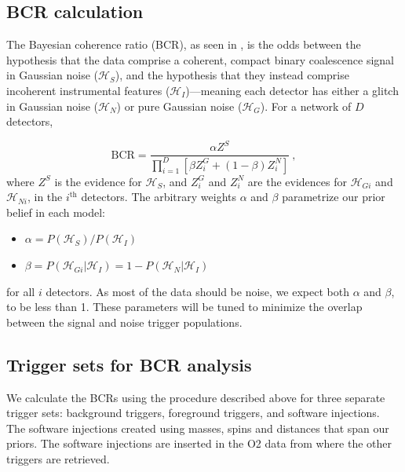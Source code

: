 \documentclass[%
 reprint,
 amsmath,amssymb,
 aps,
]{revtex4-2}
\begin{document}
\hypertarget{bcrCalculation}{%
\subsection{BCR calculation}\label{bcrCalculation}}

The Bayesian coherence ratio (BCR), as seen in \citet{bcr_paper}, is the odds between the hypothesis that the data comprise a
coherent, compact binary coalescence signal in Gaussian noise (\(\mathcal{H}_S\)), and the hypothesis that they instead
comprise incoherent instrumental features (\(\mathcal{H}_I\))---meaning each detector has either a glitch in Gaussian noise
(\(\mathcal{H}_N\)) or pure Gaussian noise (\(\mathcal{H}_G\)). For a network of \(D\) detectors,

\begin{equation}
\mathrm{BCR} = \frac{\alpha Z^{S}}{\prod_{i=1}^{D}\left[\beta Z_{i}^{G}+(1-\beta) Z_{i}^{N}\right]}\ , \label{eq:bcr}
\end{equation}
where \(Z^S\) is the evidence for \(\mathcal{H}_S\), and \(Z^{G}_i\) and
\(Z^N_i\) are the evidences for \(\mathcal{H}_{Gi}\) and \(\mathcal{H}_{Ni}\),
in the \(i^{\text{th}}\) detectors. The arbitrary weights \(\alpha\) and \(\beta\)
parametrize our prior belief in each model:

\begin{itemize}
\tightlist
\item
  \(\alpha = P(\mathcal{H}_S)/P(\mathcal{H}_I)\)
\item
  \(\beta = P(\mathcal{H}_{Gi}|\mathcal{H}_I)=1-P(\mathcal{H}_{N}|\mathcal{H}_I)\)
\end{itemize}

for all \(i\) detectors. As most of the data should be noise, we expect both \(\alpha\) and \(\beta\), to be less than 1.
These parameters will be tuned to minimize the overlap between the signal and noise trigger populations.

\hypertarget{trigger-sets-for-bcr-analysis}{%
\subsection{Trigger sets for BCR analysis}\label{trigger-sets-for-bcr-analysis}}

We calculate the BCRs using the procedure described above for three separate trigger sets: background triggers,
foreground triggers, and software injections. The software injections created using masses, spins and distances that
span our priors. The software injections are inserted in the O2 data from where the other triggers are retrieved.
\end{document}
